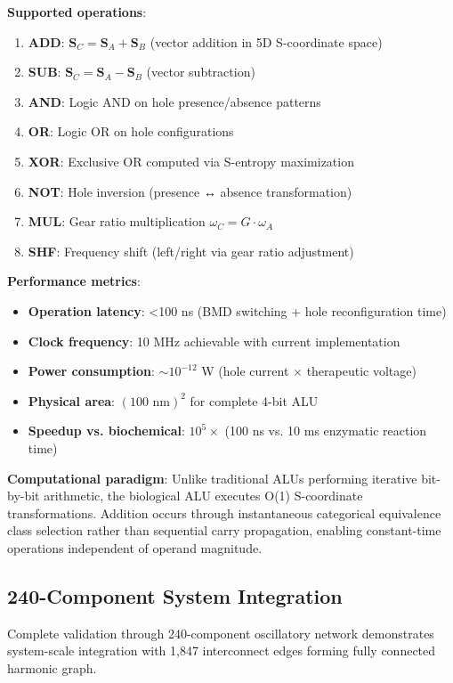 \documentclass{article}
\theoremstyle{definition}
\theoremstyle{remark}
\begin{document}
\textbf{Supported operations}:
\begin{enumerate}
\item \textbf{ADD}: $\mathbf{S}_C = \mathbf{S}_A + \mathbf{S}_B$ (vector addition in 5D S-coordinate space)
\item \textbf{SUB}: $\mathbf{S}_C = \mathbf{S}_A - \mathbf{S}_B$ (vector subtraction)
\item \textbf{AND}: Logic AND on hole presence/absence patterns
\item \textbf{OR}: Logic OR on hole configurations
\item \textbf{XOR}: Exclusive OR computed via S-entropy maximization
\item \textbf{NOT}: Hole inversion (presence ↔ absence transformation)
\item \textbf{MUL}: Gear ratio multiplication $\omega_C = G \cdot \omega_A$
\item \textbf{SHF}: Frequency shift (left/right via gear ratio adjustment)
\end{enumerate}

\textbf{Performance metrics}:
\begin{itemize}
\item \textbf{Operation latency}: <100 ns (BMD switching + hole reconfiguration time)
\item \textbf{Clock frequency}: 10 MHz achievable with current implementation
\item \textbf{Power consumption}: $\sim 10^{-12}$ W (hole current $\times$ therapeutic voltage)
\item \textbf{Physical area}: $(100 \text{ nm})^2$ for complete 4-bit ALU
\item \textbf{Speedup vs. biochemical}: $10^5\times$ (100 ns vs. 10 ms enzymatic reaction time)
\end{itemize}

\textbf{Computational paradigm}: Unlike traditional ALUs performing iterative bit-by-bit arithmetic, the biological ALU executes O(1) S-coordinate transformations. Addition occurs through instantaneous categorical equivalence class selection rather than sequential carry propagation, enabling constant-time operations independent of operand magnitude.

\subsection{240-Component System Integration}

Complete validation through 240-component oscillatory network demonstrates system-scale integration with 1,847 interconnect edges forming fully connected harmonic graph.
\end{document}
